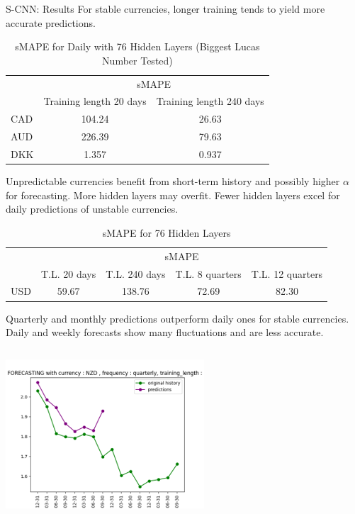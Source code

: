 \documentclass[aspectratio=169, 12pt]{beamer}
\begin{document}
\begin{frame}[allowframebreaks]{S-CNN: Results}
For stable currencies, longer training tends to yield more accurate predictions.
\begin{table}[htbp]
\centering
\caption{sMAPE for Daily with 76 Hidden Layers (Biggest Lucas Number Tested)}
\begin{tabular}{lcc}
\toprule
& \multicolumn{2}{c}{sMAPE} \\
\cmidrule{2-3}
& Training length 20 days & Training length 240 days \\
\midrule
CAD & 104.24 & 26.63 \\
AUD & 226.39 & 79.63 \\
DKK & 1.357 & 0.937 \\
\bottomrule
\end{tabular}
\end{table}
Unpredictable currencies benefit from short-term history and possibly higher $\alpha$ for forecasting. More hidden layers may overfit. Fewer hidden layers excel for daily predictions of unstable currencies.
\begin{table}[htbp]
\centering
\caption{sMAPE for 76 Hidden Layers}
\begin{tabular}{lcccc}
\toprule
& \multicolumn{4}{c}{sMAPE} \\
\cmidrule{2-5}
& T.L. 20 days & T.L. 240 days & T.L. 8 quarters & T.L. 12 quarters \\
\midrule
USD & 59.67 & 138.76 & 72.69 & 82.30 \\
\bottomrule
\end{tabular}
\end{table}
Quarterly and monthly predictions outperform daily ones for stable currencies. Daily and weekly forecasts show many fluctuations and are less accurate.
\begin{columns}
    \begin{column}{0.25\textwidth}
        \includegraphics[width=\linewidth]{plots/r1.png}

\end{column}
\end{columns}
\end{frame}
\end{document}
